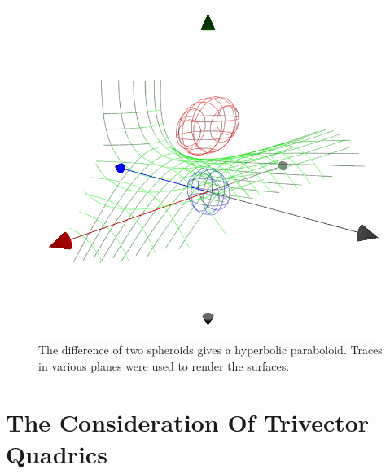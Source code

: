 \documentclass{ecgd-l}
\theoremstyle{definition}
\theoremstyle{remark}
\numberwithin{equation}{section}
\begin{document}
\begin{figure}
\includegraphics[scale=0.7]{DiffOfSpheroids}
\caption{The difference of two spheroids gives a hyperbolic paraboloid.  Traces in various planes were used to render the surfaces.}
\label{fig_diff_of_spheroids}
\end{figure}






\section{The Consideration Of Trivector Quadrics}
\end{document}
